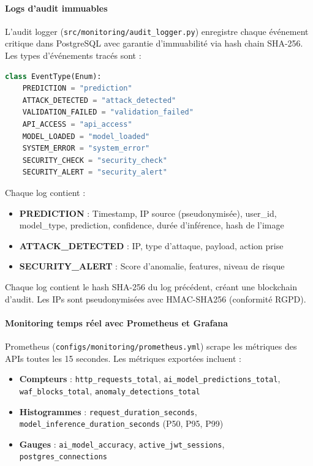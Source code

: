 \paragraph{Logs d'audit immuables}

L'audit logger (\texttt{src/monitoring/audit\_logger.py}) enregistre chaque événement critique dans PostgreSQL avec garantie d'immuabilité via hash chain SHA-256. Les types d'événements tracés sont :

\begin{lstlisting}[language=Python, caption=Types d'événements d'audit]
class EventType(Enum):
    PREDICTION = "prediction"
    ATTACK_DETECTED = "attack_detected"
    VALIDATION_FAILED = "validation_failed"
    API_ACCESS = "api_access"
    MODEL_LOADED = "model_loaded"
    SYSTEM_ERROR = "system_error"
    SECURITY_CHECK = "security_check"
    SECURITY_ALERT = "security_alert"
\end{lstlisting}

Chaque log contient :
\begin{itemize}
    \item \textbf{PREDICTION} : Timestamp, IP source (pseudonymisée), user\_id, model\_type, prediction, confidence, durée d'inférence, hash de l'image
    \item \textbf{ATTACK\_DETECTED} : IP, type d'attaque, payload, action prise
    \item \textbf{SECURITY\_ALERT} : Score d'anomalie, features, niveau de risque
\end{itemize}

Chaque log contient le hash SHA-256 du log précédent, créant une blockchain d'audit. Les IPs sont pseudonymisées avec HMAC-SHA256 (conformité RGPD).

\paragraph{Monitoring temps réel avec Prometheus et Grafana}

Prometheus (\texttt{configs/monitoring/prometheus.yml}) scrape les métriques des APIs toutes les 15 secondes. Les métriques exportées incluent :

\begin{itemize}
    \item \textbf{Compteurs} : \texttt{http\_requests\_total}, \texttt{ai\_model\_predictions\_total}, \texttt{waf\_blocks\_total}, \texttt{anomaly\_detections\_total}
    \item \textbf{Histogrammes} : \texttt{request\_duration\_seconds}, \texttt{model\_inference\_duration\_seconds} (P50, P95, P99)
    \item \textbf{Gauges} : \texttt{ai\_model\_accuracy}, \texttt{active\_jwt\_sessions}, \texttt{postgres\_connections}
\end{itemize}

